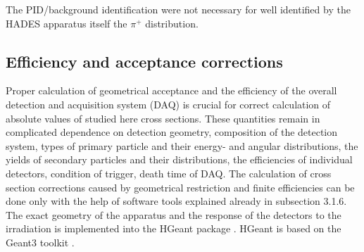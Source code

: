 The PID/background identification were not necessary for well identified by the HADES apparatus itself the $\pi^+$ distribution. 


% 
% 	
% 


\subsection{\label{Eff_corr} Efficiency and acceptance corrections}
Proper calculation of geometrical acceptance and the efficiency of
the overall detection and acquisition system (DAQ) is crucial for
correct calculation of absolute values of studied here cross
sections. These quantities remain in complicated dependence on
detection geometry, composition of the detection system, types of
primary particle and their energy- and angular distributions, the
yields of secondary particles and their distributions, the
efficiencies of individual detectors, condition of trigger, death
time of DAQ.
The calculation of cross section corrections caused by geometrical
restriction and finite efficiencies can be done only with the help
of software tools explained already in subsection 3.1.6. The exact
geometry of the apparatus and the response of the detectors to the
irradiation is implemented into the HGeant package \cite{HGeant}. HGeant is
based on the Geant3 toolkit \cite{brun1993geant}.

